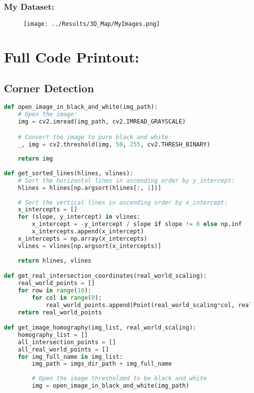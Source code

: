 \documentclass{article}
\begin{document}
\subsubsection*{My Dataset:}
\begin{figure}[H]
    \centering
    \texttt{[image: ../Results/3D\_Map/MyImages.png]}
\end{figure}



\section{Full Code Printout:}
\subsection{Corner Detection}
\begin{lstlisting}[language=Python]
def open_image_in_black_and_white(img_path):
    # Open the image:
    img = cv2.imread(img_path, cv2.IMREAD_GRAYSCALE)

    # Convert the image to pure black and white:
    _, img = cv2.threshold(img, 50, 255, cv2.THRESH_BINARY)
    
    return img
    
def get_sorted_lines(hlines, vlines):
    # Sort the horizontal lines in ascending order by y_intercept:
    hlines = hlines[np.argsort(hlines[:, 1])]
    
    # Sort the vertical lines in ascending order by x_intercept:
    x_intercepts = []
    for (slope, y_intercept) in vlines:
        x_intercept = -y_intercept / slope if slope != 0 else np.inf
        x_intercepts.append(x_intercept)
    x_intercepts = np.array(x_intercepts)
    vlines = vlines[np.argsort(x_intercepts)]
    
    return hlines, vlines

def get_real_intersection_coordinates(real_world_scaling):
    real_world_points = []
    for row in range(10):
        for col in range(8):
            real_world_points.append(Point(real_world_scaling*col, real_world_scaling*row))
    return real_world_points

def get_image_homography(img_list, real_world_scaling):
    homography_list = []
    all_intersection_points = []
    all_real_world_points = []
    for img_full_name in img_list:
        img_path = imgs_dir_path + img_full_name
        
        # Open the image thresholded to be black and white
        img = open_image_in_black_and_white(img_path)
        

\end{lstlisting}
\end{document}
